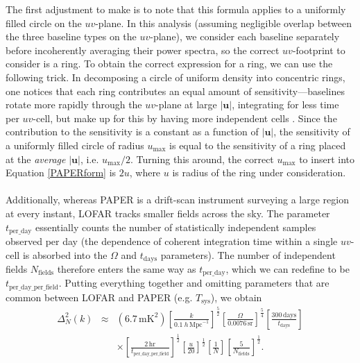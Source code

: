 \documentclass[11pt]{article}
\begin{document}
The first adjustment to make is to note that this formula applies to a uniformly filled circle on the $uv$-plane.  In this analysis (assuming negligible overlap between the three baseline types on the $uv$-plane), we consider each baseline separately before incoherently averaging their power spectra, so the correct $uv$-footprint to consider is a ring.  To obtain the correct expression for a ring, we can use the following trick.  In decomposing a circle of uniform density into concentric rings, one notices that each ring contributes an equal amount of sensitivity---baselines rotate more rapidly through the $uv$-plane at large $|\mathbf{u}|$, integrating for less time per $uv$-cell, but make up for this by having more independent cells \cite{sensitivity}.  Since the contribution to the sensitivity is a constant as a function of $|\mathbf{u}|$, the sensitivity of a uniformly filled circle of radius $u_\textrm{max}$ is equal to the sensitivity of a ring placed at the \emph{average} $|\mathbf{u}|$, i.e. $u_\textrm{max}/2$.  Turning this around, the correct $u_\textrm{max}$ to insert into Equation \ref{PAPERform} is $2u$, where $u$ is radius of the ring under consideration.\\
\\
Additionally, whereas PAPER is a drift-scan instrument surveying a large region at every instant, LOFAR tracks smaller fields across the sky.  The parameter $t_\textrm{per\_day}$ essentially counts the number of statistically independent samples observed per day (the dependence of coherent integration time within a single $uv$-cell is absorbed into the $\Omega$ and $t_\textrm{days}$ parameters).  The number of independent fields $N_\textrm{fields}$ therefore enters the same way as $t_\textrm{per\_day}$, which we can redefine to be $t_\textrm{per\_day\_per\_field}$.  Putting everything together and omitting parameters that are common between LOFAR and PAPER (e.g. $T_\textrm{sys}$), we obtain
\begin{eqnarray}
\label{finalForm}
\Delta^2_N (k) &\approx&  (6.7\,\textrm{mK}^2) \left[ \frac{k}{0.1~h\,\textrm{Mpc}^{-1}}\right]^{\frac{5}{2}}   \left[ \frac{\Omega}{0.0076\,\textrm{sr}}\right]^{\frac{5}{4}} \left[ \frac{300\,\textrm{days}}{t_\textrm{days}} \right]  \nonumber \\
&& \times \left[ \frac{2\,\textrm{hr}}{t_\textrm{per\_day\_per\_field}} \right]^\frac{1}{2} \left[ \frac{u}{20} \right]^{\frac{1}{2}} \left[ \frac{1}{N} \right] \left[ \frac{5}{N_\textrm{fields}} \right]^{\frac{1}{2}}.
\end{eqnarray}
\end{document}
